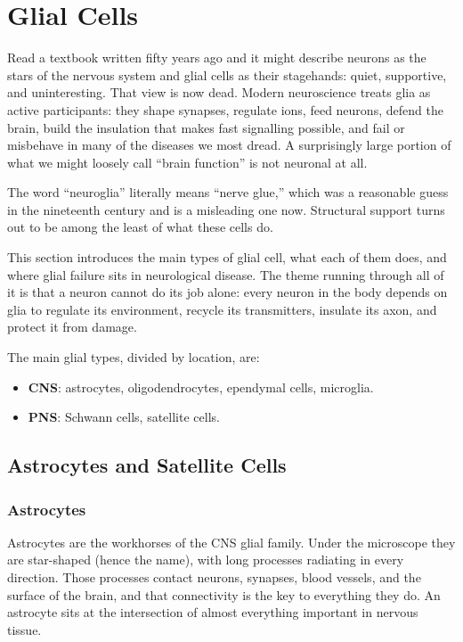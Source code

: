 \documentclass[11pt]{article}
\begin{document}
\section{Glial Cells}

Read a textbook written fifty years ago and it might describe neurons as the stars of the nervous system and glial cells as their stagehands: quiet, supportive, and uninteresting. That view is now dead. Modern neuroscience treats glia as active participants: they shape synapses, regulate ions, feed neurons, defend the brain, build the insulation that makes fast signalling possible, and fail or misbehave in many of the diseases we most dread. A surprisingly large portion of what we might loosely call ``brain function'' is not neuronal at all.

The word ``neuroglia'' literally means ``nerve glue,'' which was a reasonable guess in the nineteenth century and is a misleading one now. Structural support turns out to be among the least of what these cells do.

This section introduces the main types of glial cell, what each of them does, and where glial failure sits in neurological disease. The theme running through all of it is that a neuron cannot do its job alone: every neuron in the body depends on glia to regulate its environment, recycle its transmitters, insulate its axon, and protect it from damage.

The main glial types, divided by location, are:

\begin{itemize}
    \item \textbf{CNS}: astrocytes, oligodendrocytes, ependymal cells, microglia.
    \item \textbf{PNS}: Schwann cells, satellite cells.
\end{itemize}

\subsection{Astrocytes and Satellite Cells}

\subsubsection{Astrocytes}

Astrocytes are the workhorses of the CNS glial family. Under the microscope they are star-shaped (hence the name), with long processes radiating in every direction. Those processes contact neurons, synapses, blood vessels, and the surface of the brain, and that connectivity is the key to everything they do. An astrocyte sits at the intersection of almost everything important in nervous tissue.
\end{document}
